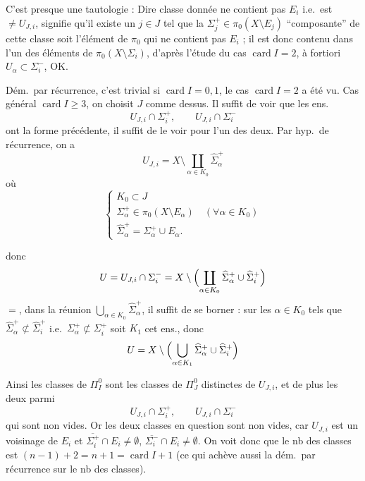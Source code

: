 \documentclass[11pt,a4paper]{article}
\begin{document}
C'est presque une tautologie : Dire   classe donnée
  ne contient pas $E_i$ i.e.\ est
$\neq U_{J,i}$, signifie qu'il existe un $j\in J$ tel que la
$\Sigma_j^+\in\pi_0(X\setminus E_j)$  “composante” de cette
classe  soit l'élément de $\pi_0$ qui ne contient pas $E_i$ ; il
est donc contenu dans l'un des éléments  de
$\pi_0(X\setminus\Sigma_i)$, d'après l'étude du cas
$\operatorname{card}I=2$,  à fortiori
$U_\alpha\subset\Sigma_i^-$, OK.

Dém.\ par récurrence, c'est trivial si $\operatorname{card}I=0,1$, le cas
$\operatorname{card}I=2$ a été vu. Cas général
$\operatorname{card}I\geq 3$, on choisit $J$ comme dessus. Il suffit de voir
que les ens.
\[
U_{J,i}\cap\Sigma_i^+, \qquad U_{J,i}\cap\Sigma_i^-
\]
ont la forme précédente, il suffit de le voir pour l'un des deux. Par hyp.\ de récurrence, on a
\[
U_{J,i} = X\setminus\coprod_{\alpha\in K_0}\widehat{\Sigma}_\alpha^+
\]
où
\[
\begin{cases}
K_0\subset J\\
\Sigma_\alpha^+\in\pi_0(X\setminus E_\alpha) \quad (\forall\alpha\in K_0)\\
\widehat{\Sigma}_\alpha^+ = \Sigma_\alpha^+\cup E_\alpha .
\end{cases}
\]

  donc
\[
U = U_{J,i}\cap\Sigma_i^- = X\setminus\Bigl(\coprod_{\alpha\in K_0}
\widehat{\Sigma}_\alpha^+ \cup \widehat{\Sigma}_i^+\Bigr)
\]
   $=$, dans la
\struck{\ill{}} réunion $\bigcup_{\alpha\in K_0}\widehat{\Sigma}_\alpha^+$,
il suffit de se borner : \ill{} sur les \struck{$\Sigma$}
$\alpha\in K_0$ tels que $\widehat{\Sigma}_\alpha^+\not\subset
\widehat{\Sigma}_i^+$ i.e.\ $\Sigma_\alpha^+\not\subset\Sigma_i^+$ soit
$K_1$ cet ens., donc
\[
U = X\setminus\Bigl(\bigcup_{\alpha\in K_1}\widehat{\Sigma}_\alpha^+
\cup\widehat{\Sigma}_i^+\Bigr)
\]

Ainsi les classes de $\Pi_I^0$ sont les classes de $\Pi_J^0$ distinctes de
$U_{J,i}$, et de plus les deux parmi
\[
U_{J,i}\cap\Sigma_i^+, \qquad U_{J,i}\cap\Sigma_i^-
\]
qui sont non vides. Or les deux classes en question sont non vides, car
\struck{\ill{}} $U_{J,i}$ est un voisinage de $E_i$ et
$\overline{\Sigma_i^+}\cap E_i\neq\emptyset$,
$\overline{\Sigma_i^-}\cap E_i\neq\emptyset$. On voit donc que le nb des
classes est \struck{\ill{}}
$(n-1)+2 = n+1 = \operatorname{card}I+1$ (ce qui achève aussi la dém.\ par
récurrence sur le nb des classes).
\end{document}

